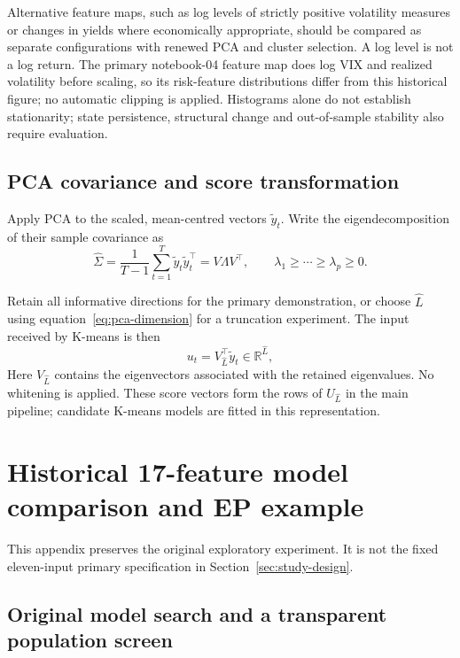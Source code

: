 \documentclass[11pt,a4paper]{article}
\begin{document}
Alternative feature maps, such as log levels of strictly positive volatility measures or changes in yields where economically appropriate, should be compared as separate configurations with renewed PCA and cluster selection. A log level is not a log return. The primary notebook-04 feature map does log VIX and realized volatility before scaling, so its risk-feature distributions differ from this historical figure; no automatic clipping is applied. Histograms alone do not establish stationarity; state persistence, structural change and out-of-sample stability also require evaluation.

\subsection{PCA covariance and score transformation}

Apply PCA to the scaled, mean-centred vectors $\widetilde y_t$. Write the eigendecomposition of their sample covariance as
\begin{equation}
\widehat\Sigma=\frac{1}{T-1}\sum_{t=1}^{T}\widetilde y_t\widetilde y_t^\top
=V\Lambda V^\top,
\qquad \lambda_1\geq\cdots\geq\lambda_p\geq0.
\end{equation}

Retain all informative directions for the primary demonstration, or choose $\widehat L$ using equation~\eqref{eq:pca-dimension} for a truncation experiment. The input received by K-means is then
\begin{equation}
u_t=V_{\widehat L}^{\top}\widetilde y_t\in\mathbb R^{\widehat L},
\label{eq:pca-scores}
\end{equation}
Here $V_{\widehat L}$ contains the eigenvectors associated with the retained eigenvalues. No whitening is applied. These score vectors form the rows of $U_{\widehat L}$ in the main pipeline; candidate K-means models are fitted in this representation.

\section{Historical 17-feature model comparison and EP example}
\label{app:model-inventory}

This appendix preserves the original exploratory experiment. It is not the fixed eleven-input primary specification in Section~\ref{sec:study-design}.

\subsection{Original model search and a transparent population screen}
\end{document}
